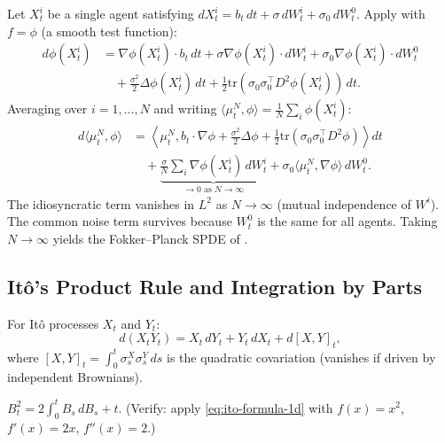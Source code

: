 \begin{example}
\label{ex:mp-ito-test-function}
Let $X_t^i$ be a single agent satisfying $dX_t^i = b_t\, dt + \sigma\, dW_t^i +
\sigma_0\, dW_t^0$. Apply  with $f = \phi$ (a smooth test
function):
\[
    \begin{aligned}
    d\phi(X_t^i) &= \nabla\phi(X_t^i) \cdot b_t\, dt + \sigma \nabla\phi(X_t^i) \cdot
    dW_t^i + \sigma_0 \nabla\phi(X_t^i) \cdot dW_t^0 \\
    &\quad + \frac{\sigma^2}{2}
    \Delta\phi(X_t^i)\, dt + \frac{1}{2} \mathrm{tr}(\sigma_0 \sigma_0^\top D^2
    \phi(X_t^i))\, dt.
    \end{aligned}
\]
Averaging over $i = 1, \dots, N$ and writing
$\langle \mu_t^N, \phi \rangle = \frac{1}{N}\sum_i \phi(X_t^i)$:
\[
    \begin{aligned}
    d\langle \mu_t^N, \phi \rangle &= \left\langle \mu_t^N, b_t \cdot \nabla\phi +
    \frac{\sigma^2}{2}\Delta\phi + \frac{1}{2}\mathrm{tr}(\sigma_0 \sigma_0^\top D^2
    \phi) \right\rangle dt \\
    &\quad + \underbrace{\frac{\sigma}{N}\sum_i \nabla\phi(X_t^i)\,
    dW_t^i}_{\to 0 \text{ as } N \to \infty} + \sigma_0 \langle \mu_t^N, \nabla\phi
    \rangle\, dW_t^0.
    \end{aligned}
\]
The idiosyncratic term vanishes in $L^2$ as $N \to \infty$ (mutual independence of
$W^i$). The common noise term survives because $W_t^0$ is the same for all agents.
Taking $N \to \infty$ yields the Fokker--Planck SPDE of .
\end{example}

\subsection{It\^o's Product Rule and Integration by Parts}

\begin{proposition}
For It\^o processes $X_t$ and $Y_t$:
\[
    d(X_t Y_t) = X_t\, dY_t + Y_t\, dX_t + d[X,Y]_t,
\]
where $[X,Y]_t = \int_0^t \sigma_s^X \sigma_s^Y\, ds$ is the quadratic covariation
(vanishes if driven by independent Brownians).
\end{proposition}

\begin{example}
$B_t^2 = 2\int_0^t B_s\, dB_s + t$. (Verify: apply \eqref{eq:ito-formula-1d} with
$f(x) = x^2$, $f'(x) = 2x$, $f''(x) = 2$.)
\end{example}

